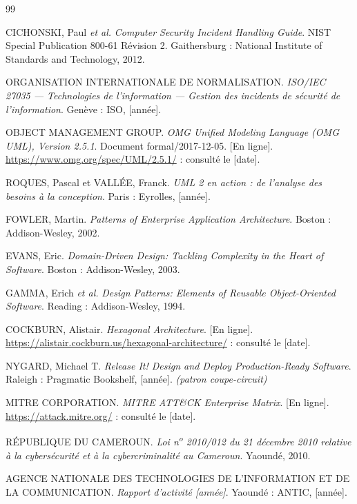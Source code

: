 \begin{thebibliography}{99}

 CICHONSKI, Paul \textit{et al.} \textit{Computer Security
  Incident Handling Guide}. NIST Special Publication 800-61 R\'evision 2.
  Gaithersburg : National Institute of Standards and Technology, 2012.

 ORGANISATION INTERNATIONALE DE NORMALISATION.
  \textit{ISO/IEC 27035 --- Technologies de l'information --- Gestion des
  incidents de s\'ecurit\'e de l'information}. Gen\`eve : ISO, [ann\'ee].

 OBJECT MANAGEMENT GROUP. \textit{OMG Unified Modeling
  Language (OMG UML), Version 2.5.1}. Document formal/2017-12-05. [En ligne].
  \url{https://www.omg.org/spec/UML/2.5.1/} : consult\'e le [date].

 ROQUES, Pascal et VALL\'EE, Franck. \textit{UML 2 en action :
  de l'analyse des besoins \`a la conception}. Paris : Eyrolles, [ann\'ee].

 FOWLER, Martin. \textit{Patterns of Enterprise Application
  Architecture}. Boston : Addison-Wesley, 2002.

 EVANS, Eric. \textit{Domain-Driven Design: Tackling
  Complexity in the Heart of Software}. Boston : Addison-Wesley, 2003.

 GAMMA, Erich \textit{et al.} \textit{Design Patterns: Elements
  of Reusable Object-Oriented Software}. Reading : Addison-Wesley, 1994.

 COCKBURN, Alistair. \textit{Hexagonal Architecture}.
  [En ligne]. \url{https://alistair.cockburn.us/hexagonal-architecture/} :
  consult\'e le [date].

 NYGARD, Michael T. \textit{Release It! Design and Deploy
  Production-Ready Software}. Raleigh : Pragmatic Bookshelf, [ann\'ee].
  \textit{(patron coupe-circuit)}

 MITRE CORPORATION. \textit{MITRE ATT\&CK Enterprise
  Matrix}. [En ligne]. \url{https://attack.mitre.org/} : consult\'e le [date].

 R\'EPUBLIQUE DU CAMEROUN. \textit{Loi n\textsuperscript{o}
  2010/012 du 21 d\'ecembre 2010 relative \`a la cybers\'ecurit\'e et \`a la
  cybercriminalit\'e au Cameroun}. Yaound\'e, 2010.

 AGENCE NATIONALE DES TECHNOLOGIES DE L'INFORMATION ET DE LA
  COMMUNICATION. \textit{Rapport d'activit\'e [ann\'ee]}. Yaound\'e : ANTIC, [ann\'ee].


\end{thebibliography}
